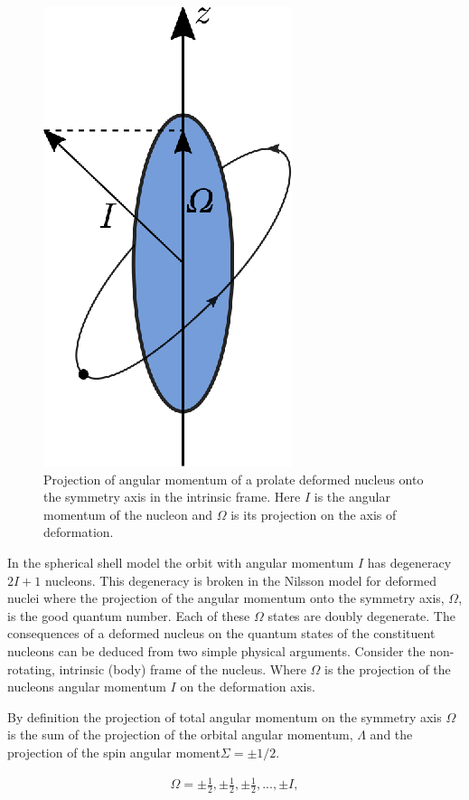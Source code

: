 \documentclass[8pt,a4paper, twoside]{report}
\begin{document}
\begin{figure}
\center
\includegraphics[scale=1]{./figures/prolate_AM.eps}
\caption{Projection of angular momentum of a prolate deformed nucleus onto the symmetry axis in the intrinsic frame. Here $I$ is the angular momentum of the nucleon and $\Omega$ is its projection on the axis of deformation.}
\label{fig:prolate_AM}
\end{figure}
In the spherical shell model the orbit with angular momentum $I$ has degeneracy $2I + 1$ nucleons. This degeneracy is broken in the Nilsson model for deformed nuclei where the projection of the angular momentum onto the symmetry axis, $\Omega$, is the good quantum number. Each of these $\Omega$ states are doubly degenerate. The consequences of a deformed nucleus on the quantum states of the constituent nucleons can be deduced from two simple physical arguments. Consider the non-rotating, intrinsic (body) frame of the nucleus. Where $\Omega$ is the projection of the nucleons angular momentum $I$ on the deformation axis. 

By definition the projection of total angular momentum on the symmetry axis $\Omega$ is the sum of the projection of the orbital angular momentum, $\Lambda$ and the projection of the spin angular moment$\Sigma = \pm 1/2$.  

\begin{align*}
\Omega = \pm\tfrac{1}{2}, \pm\tfrac{1}{2},  \pm\tfrac{1}{2},  ... , \pm I, 
\end{align*}
\end{document}
